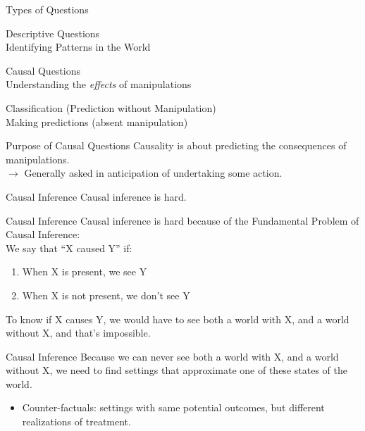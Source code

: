\documentclass[11pt]{beamer}
\begin{document}
\begin{frame}[c]{Types of Questions}
  \begin{enumerate}
    {\color{gray} \item {Descriptive Questions} \\
    {\color{gray} Identifying Patterns in the World} }
    \item \alert{Causal Questions} \\
    {\color{gray} Understanding the \emph{effects} of manipulations}
    {\color{gray} \item Classification (Prediction without Manipulation) \\
    {\color{gray} Making predictions (absent manipulation)} }
  \end{enumerate}
\end{frame}

\begin{frame}[c]{Purpose of Causal Questions}
  \pause Causality is about predicting the consequences of \alert{manipulations}.  \\
\pause $\rightarrow$ Generally asked in anticipation of undertaking some action. 
  \end{frame}
  
\begin{frame}[c]{Causal Inference}
  \pause Causal inference is \alert{hard}.
\end{frame}

\begin{frame}[c]{Causal Inference}
  Causal inference is hard because of the \alert{Fundamental Problem of Causal Inference:} \\
  \pause We say that ``X caused Y'' if:
  \begin{enumerate}
    \pause \item When X is present, we see Y
    \pause \item When X is not present, we don't see Y
  \end{enumerate}
  \pause To \alert{know} if X causes Y, we would have to see \alert{both} a world with X, and a world without X, and that's impossible. 
\end{frame}

\begin{frame}[c]{Causal Inference}
  Because we can never see \alert{both} a world with X, and a world without X, \pause we need to find settings that \alert{approximate} one of these states of the world. \\
  \begin{itemize}
    \pause \item Counter-factuals: settings with same \alert{potential outcomes}, but different realizations of treatment.
  \end{itemize}
\end{frame}
\end{document}
